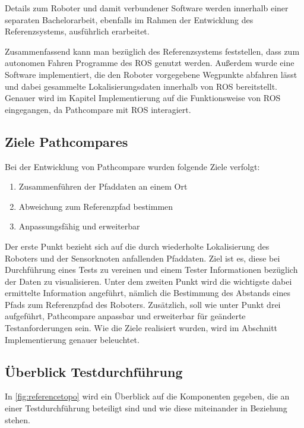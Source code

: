 Details zum Roboter und damit verbundener Software werden 
innerhalb einer separaten Bachelorarbeit, ebenfalls im Rahmen der
Entwicklung des Referenzsystems, ausführlich erarbeitet.

Zusammenfassend kann man bezüglich des Referenzsystems feststellen, dass zum autonomen Fahren
Programme des \gls{ROS} genutzt werden. Außerdem wurde eine Software implementiert,
die den Roboter vorgegebene Wegpunkte abfahren lässt und dabei gesammelte
Lokalisierungsdaten innerhalb von \gls{ROS} bereitstellt. Genauer wird im
Kapitel Implementierung auf die Funktionsweise von \gls{ROS} eingegangen, da
Pathcompare mit ROS interagiert.

\subsection{Ziele Pathcompares}

Bei der Entwicklung von Pathcompare wurden folgende Ziele verfolgt:

\begin{enumerate}
  \item Zusammenführen der Pfaddaten an einem Ort
  \item Abweichung zum Referenzpfad bestimmen
  \item Anpassungsfähig und erweiterbar
\end{enumerate}

Der erste Punkt bezieht sich auf die durch wiederholte Lokalisierung des
Roboters und der Sensorknoten anfallenden Pfaddaten. Ziel ist es, diese bei
Durchführung eines Tests zu vereinen und einem Tester Informationen bezüglich
der Daten zu visualisieren. Unter dem zweiten Punkt wird die wichtigste dabei
ermittelte Information angeführt, nämlich die Bestimmung des Abstands eines
Pfads zum Referenzpfad des Roboters. Zusätzlich, soll wie unter Punkt drei
aufgeführt, Pathcompare anpassbar und erweiterbar für geänderte
Testanforderungen sein. Wie die Ziele realisiert wurden, wird im Abschnitt
Implementierung genauer beleuchtet.

\subsection{Überblick Testdurchführung}

In \autoref{fig:referencetopo} wird ein Überblick auf die Komponenten gegeben,
die an einer Testdurchführung beteiligt sind und wie diese miteinander in
Beziehung stehen.

